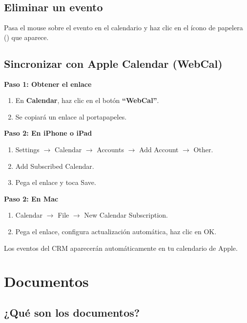 \documentclass[12pt,oneside]{article}
\begin{document}
\subsection{Eliminar un evento}

Pasa el mouse sobre el evento en el calendario y haz clic en el ícono de papelera (\faTrash) que aparece.

\subsection{Sincronizar con Apple Calendar (WebCal)}

\noindent\textbf{Paso 1: Obtener el enlace}
\begin{enumerate}[leftmargin=*]
  \item En \textbf{Calendar}, haz clic en el botón \textbf{“WebCal”}.
  \item Se copiará un enlace al portapapeles.
\end{enumerate}

\noindent\textbf{Paso 2: En iPhone o iPad}
\begin{enumerate}[leftmargin=*]
  \item Settings $\rightarrow$ Calendar $\rightarrow$ Accounts $\rightarrow$ Add Account $\rightarrow$ Other.
  \item Add Subscribed Calendar.
  \item Pega el enlace y toca Save.
\end{enumerate}

\noindent\textbf{Paso 2: En Mac}
\begin{enumerate}[leftmargin=*]
  \item Calendar $\rightarrow$ File $\rightarrow$ New Calendar Subscription.
  \item Pega el enlace, configura actualización automática, haz clic en OK.
\end{enumerate}

\noindent Los eventos del CRM aparecerán automáticamente en tu calendario de Apple.

\section{Documentos}

\subsection{¿Qué son los documentos?}
\end{document}
